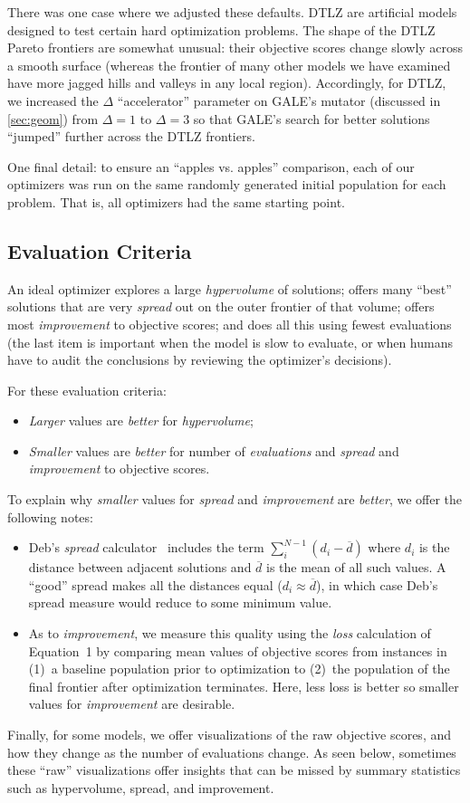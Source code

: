 \documentclass[10pt,journal,compsoc]{IEEEtran}
\newcommand{\bi}{\begin{itemize}}
\newcommand{\ei}{\end{itemize}}
\newcommand{\tion}[1]{\textsection\ref{sec:#1}}
\begin{document}
There was one case where we adjusted these defaults. 
DTLZ are artificial models designed to test certain hard optimization problems.
The shape of the DTLZ Pareto frontiers are somewhat unusual:
their
objective scores change slowly
across a smooth surface (whereas the frontier of
many other models we have examined have more jagged hills and valleys
in any local region). Accordingly, for DTLZ, we increased the
$\Delta$ ``accelerator'' parameter on GALE's mutator
(discussed in \tion{geom}) from $\Delta=1$ to $\Delta=3$
so that  GALE's search for better solutions
``jumped'' further across the DTLZ frontiers.

One final detail: to ensure an ``apples vs. apples'' comparison, 
each of our optimizers was run on the same randomly generated
initial population for each problem. That is, all optimizers had the same starting point.
 


 
\subsection{Evaluation Criteria}\label{sec:eval}
An ideal optimizer explores a  large {\em
  hypervolume} of solutions;  offers many  ``best''
solutions that are very {\em spread} out on the outer
frontier of that volume; 
offers most {\em improvement} to objective scores; and does all this
using fewest evaluations (the last item is  important when the model is slow to evaluate, or
when humans have to audit the conclusions by reviewing the
optimizer's decisions).

For these evaluation criteria:
\bi
\item
{\em Larger} values are {\em better}  for {\em hypervolume};
\item 
{\em Smaller} values are {\em better}  for number of {\em evaluations} and {\em spread} and {\em improvement} to objective scores.
\ei
To explain why {\em smaller} values for {\em spread} and {\em improvement} are {\em better},
we offer the following notes:
\bi
\item
Deb's {\em spread} calculator~\cite{deb00afast} includes
the term 
$\sum_i^{N-1} (d_i - \overline{d})$ 
where $d_i$
is the distance between adjacent solutions and
$\overline{d}$ is the mean of all such values.  A
``good'' spread makes all the distances equal ($d_i
\approx \overline{d}$), in which case Deb's spread
measure would reduce to some minimum value.
\item
As to {\em improvement}, we measure this quality using the {\em loss} calculation
of Equation~1 
by  comparing mean values of objective scores from instances in (1)~a baseline population prior to optimization
to (2)~the population of the final frontier after optimization terminates.
Here, 
less loss is better so smaller values for {\em improvement} are desirable. 
\ei
Finally, for some models, we offer visualizations of the raw objective scores, and how they change
as the number of evaluations change. As seen below, sometimes these ``raw'' visualizations
offer insights that can be missed by summary statistics such as hypervolume, spread, and improvement. 
 
\end{document}
